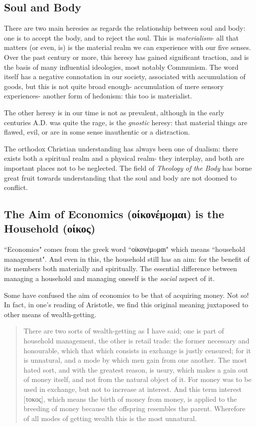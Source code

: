 \documentclass[letterpaper]{article}
\begin{document}
\subsection{Soul and Body}

There are two main heresies as regards the relationship between soul and body: one is to accept the body, and to reject the soul. This is \textit{materialism}- all that matters (or even, is) is the material realm we can experience with our five senses. Over the past century or more, this heresy has gained significant traction, and is the basis of many influential ideologies, most notably Communism. The word itself has a negative connotation in our society, associated with accumulation of goods, but this is not quite broad enough- accumulation of mere sensory experiences- another form of hedonism: this too is materialist.

The other heresy is in our time is not as prevalent, although in the early centuries A.D. was quite the rage, is the \textit{gnostic} heresy: that material things are flawed, evil, or are in some sense inauthentic or a distraction.

The orthodox Christian understanding has always been one of dualism: there exists both a spiritual realm and a physical realm- they interplay, and both are important places not to be neglected. The field of \textit{Theology of the Body} has borne great fruit towards understanding that the soul and body are not doomed to conflict.

\subsection{The Aim of Economics (οίκονέμoμαι) is the Household (οίκος)}

``Economics" comes from the greek word ``οίκονέμoμαι" which means ``household management". And even in this, the household still has an aim: for the benefit of its members both materially and spiritually. The essential difference between managing a household and managing oneself is the \textit{social} aspect of it.

Some have confused the aim of economics to be that of acquiring money. Not so! In fact, in one's reading of Aristotle, we find this original meaning juxtaposed to other means of wealth-getting.

\begin{quote}
  There are two sorts of wealth-getting as I have said; one is part of household management, the other is retail trade: the former necessary and honourable, which that which consists in exchange is justly censured; for it is unnatural, and a mode by which men gain from one another. The most hated sort, and with the greatest reason, is usury, which makes a gain out of money itself, and not from the natural object of it. For money was to be used in exchange, but not to increase at interest. And this term interest [τοκος], which means the birth of money from money, is applied to the breeding of money because the offspring resembles the parent. Wherefore of all modes of getting wealth this is the most unnatural.
\end{quote}
\end{document}
